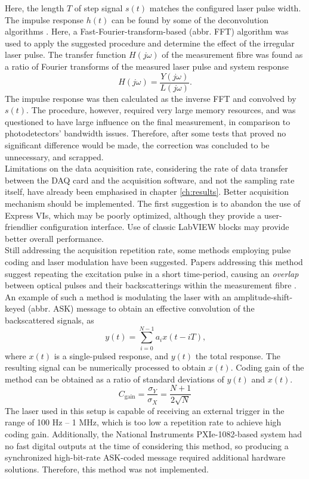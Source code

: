 \documentclass{standalone}
\begin{document}
Here, the length $T$ of step signal $s(t)$ matches the configured laser pulse width. The impulse response $h(t)$ can be found by some of the deconvolution algorithms \cite{fer:obrinf}. Here, a Fast-Fourier-transform-based (abbr. FFT) algorithm was used to apply the suggested procedure and determine the effect of the irregular laser pulse. The transfer function $H(j\omega)$ of the measurement fibre was found as a ratio of Fourier transforms of the measured laser pulse and system response
\begin{equation}
H(j\omega) = \frac{Y(j\omega)}{L(j\omega)} \textrm{.}
\end{equation}
The impulse response was then calculated as the inverse FFT and convolved by $s(t)$. The procedure, however, required very large memory resources, and was questioned to have large influence on the final measurement, in comparison to photodetectors' bandwidth issues. Therefore, after some tests that proved no significant difference would be made, the correction was concluded to be unnecessary, and scrapped. \\

Limitations on the data acquisition rate, considering the rate of data transfer between the DAQ card and the acquisition software, and not the sampling rate itself, have already been emphasised in chapter \ref{ch:results}. Better acquisition mechanism should be implemented. The first suggestion is to abandon the use of Express VIs, which may be poorly optimized, although they provide a user-friendlier configuration interface. Use of classic LabVIEW blocks may provide better overall performance. \\

Still addressing the acquisition repetition rate, some methods employing pulse coding and laser modulation have been suggested. Papers addressing this method suggest repeating the excitation pulse in a short time-period, causing an \textit{overlap} between optical pulses and their backscatterings within the measurement fibre \cite{coding1}\cite{coding2}. An example of such a method is modulating the laser with an amplitude-shift-keyed (abbr. ASK) message to obtain an effective convolution of the backscattered signals, as
\begin{equation}
y(t) = \sum_{i = 0}^{N-1} a_i x(t - iT) \textrm{,}
\end{equation}
where $x(t)$ is a single-pulsed response, and $y(t)$ the total response. The resulting signal can be numerically processed to obtain $x(t)$. Coding gain of the method can be obtained as a ratio of standard deviations of $y(t)$ and $x(t)$.
\begin{equation}
C_\textrm{gain} = \frac{\sigma_Y}{\sigma_X} = \frac{N+1}{2 \sqrt{N}}
\end{equation}
The laser used in this setup is capable of receiving an external trigger in the range of 100 Hz -- 1 MHz, which is too low a repetition rate to achieve high coding gain. Additionally, the National Instruments PXIe-1082-based system had no fast digital outputs at the time of considering this method, so producing a synchronized high-bit-rate ASK-coded message required additional hardware solutions. Therefore, this method was not implemented. \\
\end{document}

